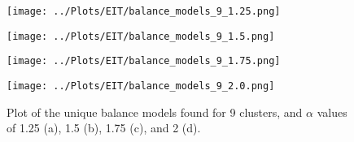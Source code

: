 \documentclass[12pt]{report} %
\begin{document}
\begin{figure}[htbp]
  \centering
  \begin{minipage}{0.5\textwidth}
    \centering
    \texttt{[image: ../Plots/EIT/balance\_models\_9\_1.25.png]}
    \subcaption{}
  \end{minipage}

  \begin{minipage}{0.5\textwidth}
    \centering
    \texttt{[image: ../Plots/EIT/balance\_models\_9\_1.5.png]}
    \subcaption{}
  \end{minipage}

  \begin{minipage}{0.45\textwidth}
    \centering
    \texttt{[image: ../Plots/EIT/balance\_models\_9\_1.75.png]}
    \subcaption{}
  \end{minipage}

  \begin{minipage}{0.45\textwidth}
    \centering
    \texttt{[image: ../Plots/EIT/balance\_models\_9\_2.0.png]}
    \subcaption{}
  \end{minipage}

  \caption{Plot of the unique balance models found for 9 clusters, and $\alpha$ values of 1.25 (a), 1.5 (b), 1.75 (c), and 2 (d).}
  \label{fig:EIT_balance_models}
\end{figure}












\end{document}

